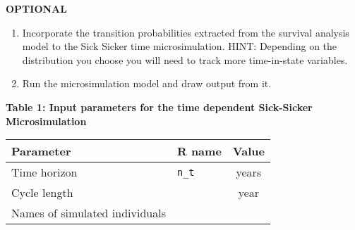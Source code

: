 \documentclass[
]{article}
\begin{document}
\textbf{OPTIONAL}

\begin{enumerate}
\def\labelenumi{\arabic{enumi}.}
\item
  Incorporate the transition probabilities extracted from the survival
  analysis model to the Sick Sicker time microsimulation. HINT:
  Depending on the distribution you choose you will need to track more
  time-in-state variables.
\item
  Run the microsimulation model and draw output from it.
\end{enumerate}

\textbf{Table 1: Input parameters for the time dependent Sick-Sicker
Microsimulation }

\begin{longtable}[]{@{}llc@{}}
\toprule
\begin{minipage}[b]{0.51\columnwidth}\raggedright
\textbf{Parameter}\strut
\end{minipage} & \begin{minipage}[b]{0.19\columnwidth}\raggedright
\textbf{R name}\strut
\end{minipage} & \begin{minipage}[b]{0.21\columnwidth}\centering
\textbf{Value}\strut
\end{minipage}\tabularnewline
\midrule
\endhead
\begin{minipage}[t]{0.51\columnwidth}\raggedright
Time horizon\strut
\end{minipage} & \begin{minipage}[t]{0.19\columnwidth}\raggedright
\texttt{n\_t}\strut
\end{minipage} & \begin{minipage}[t]{0.21\columnwidth}\centering
30 years\strut
\end{minipage}\tabularnewline
\begin{minipage}[t]{0.51\columnwidth}\raggedright
Cycle length\strut
\end{minipage} & \begin{minipage}[t]{0.19\columnwidth}\raggedright
\strut
\end{minipage} & \begin{minipage}[t]{0.21\columnwidth}\centering
1 year\strut
\end{minipage}\tabularnewline
\begin{minipage}[t]{0.51\columnwidth}\raggedright
Names of simulated individuals\strut
\end{minipage} & \begin{minipage}[t]{0.19\columnwidth}\raggedright

\end{minipage}
\end{longtable}
\end{document}
